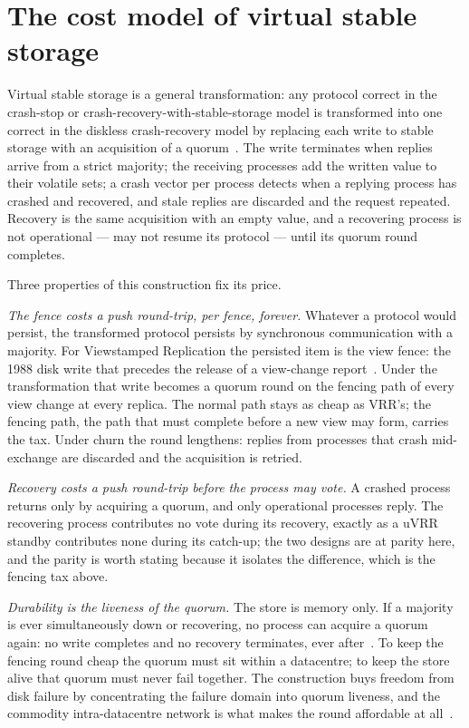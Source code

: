 \documentclass[10pt,journal,letterpaper]{IEEEtran}
\begin{document}
\section{The cost model of virtual stable storage}\label{sec:cost}
Virtual stable storage is a general transformation: any protocol correct in
the crash-stop or crash-recovery-with-stable-storage model is transformed
into one correct in the diskless crash-recovery model by replacing each write
to stable storage with an acquisition of a quorum~\cite{diskless}.
The write terminates when replies arrive from a strict majority; the
receiving processes add the written value to their volatile sets; a crash
vector per process detects when a replying process has crashed and recovered,
and stale replies are discarded and the request repeated.
Recovery is the same acquisition with an empty value, and a recovering
process is not operational --- may not resume its protocol --- until its
quorum round completes.

Three properties of this construction fix its price.

\emph{The fence costs a push round-trip, per fence, forever.}
Whatever a protocol would persist, the transformed protocol persists by
synchronous communication with a majority.
For Viewstamped Replication the persisted item is the view fence: the 1988
disk write that precedes the release of a view-change report~\cite{vr}.
Under the transformation that write becomes a quorum round on the fencing
path of every view change at every replica.
The normal path stays as cheap as VRR's; the fencing path, the path that must
complete before a new view may form, carries the tax.
Under churn the round lengthens: replies from processes that crash
mid-exchange are discarded and the acquisition is retried.

\emph{Recovery costs a push round-trip before the process may vote.}
A crashed process returns only by acquiring a quorum, and only operational
processes reply.
The recovering process contributes no vote during its recovery, exactly as a
uVRR standby contributes none during its catch-up; the two designs are at
parity here, and the parity is worth stating because it isolates the
difference, which is the fencing tax above.

\emph{Durability is the liveness of the quorum.}
The store is memory only.
If a majority is ever simultaneously down or recovering, no process can
acquire a quorum again: no write completes and no recovery terminates, ever
after~\cite{diskless}.
To keep the fencing round cheap the quorum must sit within a datacentre; to
keep the store alive that quorum must never fail together.
The construction buys freedom from disk failure by concentrating the failure
domain into quorum liveness, and the commodity intra-datacentre network is
what makes the round affordable at all~\cite{netdisk}.
\end{document}
